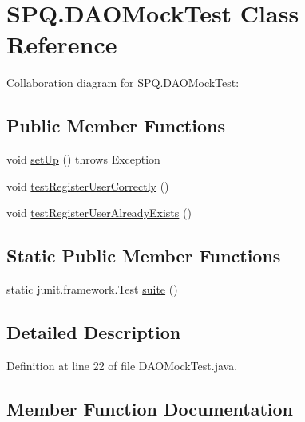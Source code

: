 \hypertarget{class_s_p_q_1_1_d_a_o_mock_test}{}\section{S\+P\+Q.\+D\+A\+O\+Mock\+Test Class Reference}
\label{class_s_p_q_1_1_d_a_o_mock_test}


Collaboration diagram for S\+P\+Q.\+D\+A\+O\+Mock\+Test\+:
\subsection*{Public Member Functions}
\begin{DoxyCompactItemize}
\item 
void \mbox{\hyperlink{class_s_p_q_1_1_d_a_o_mock_test_a14661ea54177083c2de25c20e54f5436}{set\+Up}} ()  throws Exception 
\item 
void \mbox{\hyperlink{class_s_p_q_1_1_d_a_o_mock_test_a52505d1cfefe105f8098147df9d2fce0}{test\+Register\+User\+Correctly}} ()
\item 
void \mbox{\hyperlink{class_s_p_q_1_1_d_a_o_mock_test_a76004a006ddce595edc7011aafccbe7e}{test\+Register\+User\+Already\+Exists}} ()
\end{DoxyCompactItemize}
\subsection*{Static Public Member Functions}
\begin{DoxyCompactItemize}
\item 
static junit.\+framework.\+Test \mbox{\hyperlink{class_s_p_q_1_1_d_a_o_mock_test_a940e298a31bfdb331a7fdd7a5655e270}{suite}} ()
\end{DoxyCompactItemize}


\subsection{Detailed Description}


Definition at line 22 of file D\+A\+O\+Mock\+Test.\+java.



\subsection{Member Function Documentation}
\mbox{\label{class_s_p_q_1_1_d_a_o_mock_test_a14661ea54177083c2de25c20e54f5436}} 

